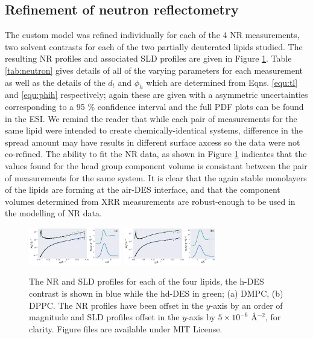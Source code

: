 \documentclass[twoside,twocolumn,9pt]{article}
\begin{document}
\subsection{Refinement of neutron reflectometry}
The custom model was refined individually for each of the 4 NR measurements, two solvent contrasts for each of the two partially deuterated lipids studied. The resulting NR profiles and associated SLD profiles are given in Figure \ref{fig:neutron}. Table \ref{tab:neutron} gives details of all of the varying parameters for each measurement as well as the details of the $d_t$ and $\phi_h$ which are determined from Eqns. \ref{equ:tl} and \ref{equ:phih} respectively; again these are given with a asymmetric uncertainties corresponding to a 95 \% confidence interval and the full PDF plots can be found in the ESI. We remind the reader that while each pair of measurements for the same lipid were intended to create chemically-identical systems, difference in the spread amount may have results in different surface axcess so the data were not co-refined. The ability to fit the NR data, as shown in Figure \ref{fig:neutron} indicates that the values found for the head group component volume is consistant between the pair of measurements for the same system. It is clear that the again stable monolayers of the lipids are forming at the air-DES interface, and that the component volumes determined from XRR measurements are robust-enough to be used in the modelling of NR data. 

\begin{figure}
	\centering
	\includegraphics[width=0.36\textwidth]{figures/nDMPC_all_data}
	\includegraphics[width=0.36\textwidth]{figures/nDPPC_all_data}
	\caption{The NR and SLD profiles for each of the four lipids, the h-DES contrast is shown in blue while the hd-DES in green; (a) DMPC, (b) DPPC. The NR profiles have been offset in the $y$-axis by an order of magnitude and SLD profiles offset in the $y$-axis by $5\times10^{-6}$ \AA$^{-2}$, for clarity. Figure files are available under MIT License.\cite{mccluskey_2018}}
	\label{fig:neutron}
\end{figure}
\end{document}

